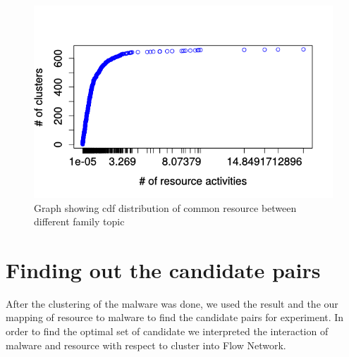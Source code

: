 \begin{figure}
\begin{center}
  \includegraphics[scale=0.7]{figures/inter_clustered_common.png}
\end{center}
\captionsetup{font=small}
\caption{Graph showing cdf distribution of common resource between different family topic}
\label{fig:interclustcommon}
\end{figure}

\section{Finding out the candidate pairs}
\label{sec:Finding out the candidate pairs}
After the clustering of the malware was done, we used the result and the our mapping of resource to malware to find the candidate pairs for experiment.
In order to find the optimal set of candidate we interpreted the interaction of malware and resource with respect to cluster into Flow Network.
